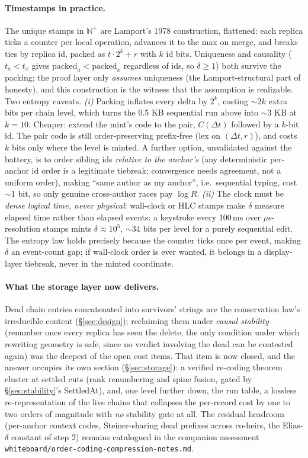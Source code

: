 \documentclass[11pt]{article}
\newcommand{\code}[1]{\texttt{#1}}
\begin{document}
\paragraph{Timestamps in practice.} The unique stamps in
$\mathbb{N}^{+}$ are Lamport's 1978 construction, flattened: each
replica ticks a counter per local operation, advances it to the max
on merge, and breaks ties by replica id, packed as
$t \cdot 2^{k} + r$ with $k$ id bits. Uniqueness and causality
($t_a < t_x$ gives $\mathrm{packed}_a < \mathrm{packed}_x$ regardless
of ids, so $\delta \ge 1$) both survive the packing; the proof layer
only \emph{assumes} uniqueness (the Lamport-structural part of
honesty), and this construction is the witness that the assumption is
realizable. Two entropy caveats. \emph{(i)} Packing inflates every
delta by $2^{k}$, costing $\sim$$2k$ extra bits per chain level, which
turns the 0.5 KB sequential run above into $\sim$3 KB at $k = 10$.
Cheaper: extend the mint's code to the pair, $C(\Delta t)$ followed
by a $k$-bit id. The pair code is still order-preserving prefix-free
(lex on $(\Delta t, r)$), and costs $k$ bits only where the level is
minted. A further option, unvalidated against the battery, is to order
sibling ids \emph{relative to
the anchor's} (any deterministic per-anchor id order is a legitimate
tiebreak; convergence needs agreement, not a uniform order), making
``same author as my anchor'', i.e.\ sequential typing, cost $\sim$1
bit, so only genuine cross-author races pay $\log R$. \emph{(ii)} The
clock must be \emph{dense logical time, never physical}: wall-clock
or HLC stamps make $\delta$ measure elapsed time rather than elapsed
events: a keystroke every 100\,ms over $\mu$s-resolution stamps
mints $\delta \approx 10^{5}$, $\sim$34 bits per level for a purely
sequential edit. The entropy law holds precisely because the counter
ticks once per event, making $\delta$ an event-count gap; if
wall-clock order is ever wanted, it belongs in a display-layer
tiebreak, never in the minted coordinate.

\paragraph{What the storage layer now delivers.} Dead chain entries
concatenated into survivors' strings are the conservation law's
irreducible content (\S\ref{sec:design}); reclaiming them under
\emph{causal stability} (renumber
once every replica has seen the delete, the only condition under which
rewriting geometry is safe, since no verdict involving the dead can be
contested again) was the deepest of the open cost items. That item is
now closed, and the answer occupies its own section
(\S\ref{sec:storage}): a verified re-coding theorem cluster at settled
cuts (rank renumbering and spine fusion, gated by
\S\ref{sec:stability}'s SettledAt), and, one level further down, the
run table, a lossless re-representation of the live chains that
collapses the per-record cost by one to two orders of magnitude with
\emph{no} stability gate at all. The residual headroom (per-anchor
context codes, Steiner-sharing dead prefixes across co-heirs, the
Elias-$\delta$ constant of step 2) remains catalogued in the companion
assessment \code{whiteboard/order-coding-compression-notes.md}.
\end{document}
